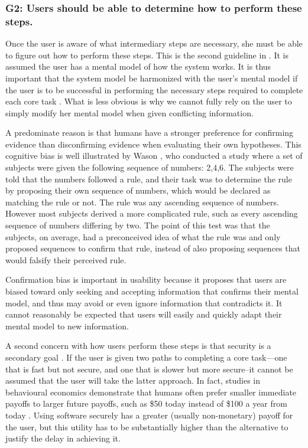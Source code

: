 \subsubsection*{G2: Users should be able to determine how to perform these steps.} Once the user is aware of what intermediary steps are necessary, she must be able to figure out how to perform these steps. This is the second guideline in \cite{johnny}. It is assumed the user has a mental model of how the system works. It is thus important that the system model be harmonized with the user's mental model if the user is to be successful in performing the necessary steps required to complete each core task  \cite{cw}. What is less obvious is why we cannot fully rely on the user to simply modify her mental model when given conflicting information.

A predominate reason is that humans have a stronger preference for confirming evidence than disconfirming evidence when evaluating their own hypotheses. This cognitive bias is well illustrated by Wason \cite{bias1}, who conducted a study where a set of subjects were given the following sequence of numbers: 2,4,6. The subjects were told that the numbers followed a rule, and their task was to determine the rule by proposing their own sequence of numbers, which would be declared as matching the rule or not. The rule was any ascending sequence of numbers. However most subjects derived a more complicated rule, such as every ascending sequence of numbers differing by two. The point of this test was that the subjects, on average, had a preconceived idea of what the rule was and only proposed sequences to confirm that rule, instead of also proposing sequences that would falsify their perceived rule.

Confirmation bias is important in usability because it proposes that users are biased toward only seeking and accepting information that confirms their mental model, and thus may avoid or even ignore information that contradicts it. It cannot reasonably be expected that users will easily and quickly adapt their mental model to new information.

A second concern with how users perform these steps is that security is a secondary goal \cite{johnny,karat}. If the user is given two paths to completing a core task---one that is fast but not secure, and one that is slower but more secure--it cannot be assumed that the user will take the latter approach. In fact, studies in behavioural economics demonstrate that humans often prefer smaller immediate payoffs to larger future payoffs, such as \$50 today instead of \$100 a year from today \cite{bias2}. Using software securely has a greater (usually non-monetary) payoff for the user, but this utility has to be substantially higher than the alternative to justify the delay in achieving it.

